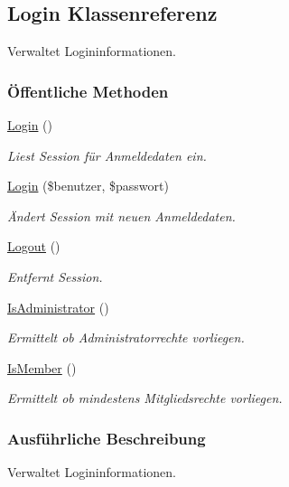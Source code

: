 \hypertarget{classLogin}{
\subsection{Login Klassenreferenz}
\label{classLogin}
}
Verwaltet Logininformationen.  


\subsubsection*{\"{O}ffentliche Methoden}
\begin{CompactItemize}
\item 
\hyperlink{classLogin_4847f3e07e43b540d3339392346f87ff}{Login} ()
\begin{CompactList}\small\item\em Liest Session für Anmeldedaten ein. \item\end{CompactList}\item 
\hyperlink{classLogin_86b5c73ef1fb4bd03f91cc4771c960b7}{Login} (\$benutzer, \$passwort)
\begin{CompactList}\small\item\em Ändert Session mit neuen Anmeldedaten. \item\end{CompactList}\item 
\hyperlink{classLogin_4cbf74bd382f34e863aec07c3eda0400}{Logout} ()
\begin{CompactList}\small\item\em Entfernt Session. \item\end{CompactList}\item 
\hyperlink{classLogin_6c120224aa6719f58c6ccd08acc28758}{Is\-Administrator} ()
\begin{CompactList}\small\item\em Ermittelt ob Administratorrechte vorliegen. \item\end{CompactList}\item 
\hyperlink{classLogin_70d2747b0aa454f4203a789afea25318}{Is\-Member} ()
\begin{CompactList}\small\item\em Ermittelt ob mindestens Mitgliedsrechte vorliegen. \item\end{CompactList}\end{CompactItemize}


\subsubsection{Ausf\"{u}hrliche Beschreibung}
Verwaltet Logininformationen. 

